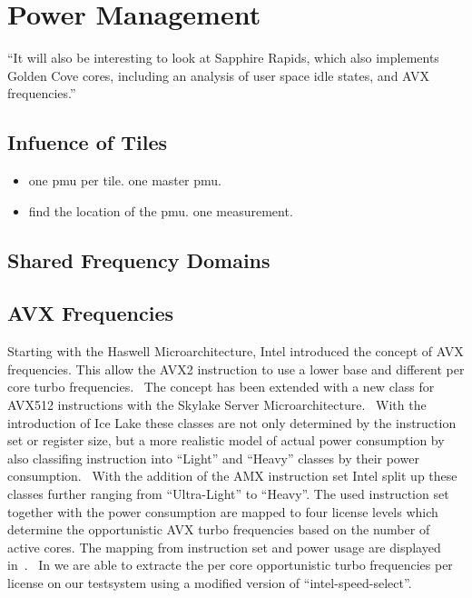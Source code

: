 \chapter{Power Management}
``It will also be interesting to look at Sapphire Rapids, which also implements Golden Cove cores, including an analysis of user space idle states, and AVX frequencies.''

\section{Infuence of Tiles}
\begin{itemize}
    \item one pmu per tile. one master pmu.
    \item find the location of the pmu. one measurement.
\end{itemize}

\section{Shared Frequency Domains}

\section{AVX Frequencies}

Starting with the Haswell Microarchitecture, Intel introduced the concept of AVX frequencies.
This allow the AVX2 instruction to use a lower base and different per core turbo frequencies.~\cite{Hackenberg_2015_Haswell}
The concept has been extended with a new class for AVX512 instructions with the Skylake Server Microarchitecture.~\cite[Sec. 2.6.3]{Intel_Optimization_Reference_Manual_050}
With the introduction of Ice Lake these classes are not only determined by the instruction set or register size, but a more realistic model of actual power consumption by also classifing instruction into ``Light'' and ``Heavy'' classes by their power consumption.~\cite{papazian_new_2020}
With the addition of the AMX instruction set Intel split up these classes further ranging from ``Ultra-Light'' to ``Heavy''.
The used instruction set together with the power consumption are mapped to four license levels which determine the opportunistic AVX turbo frequencies based on the number of active cores.
The mapping from instruction set and power usage are displayed in~.~\cite{ServeTheHome_Emerald_Rapids_2023}
In  we are able to extracte the per core opportunistic turbo frequencies per license on our testsystem using a modified version of ``intel-speed-select''.

